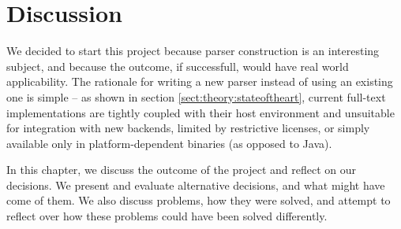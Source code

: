 \chapter{Discussion}
\label{chapter:discussion}
We decided to start this project because parser construction is an interesting
subject, and because the outcome, if successfull, would have real world
applicability. The rationale for writing a new parser instead of using an
existing one is simple -- as shown in section \ref{sect:theory:stateoftheart},
current full-text implementations are tightly coupled with their
host environment and unsuitable for integration with new backends, limited by
restrictive licenses, or simply available only in platform-dependent binaries
(as opposed to Java). 

In this chapter, we discuss the outcome of the project and reflect on
our decisions. We present and evaluate alternative decisions, and what
might have come of them. We also discuss problems, how they were
solved, and attempt to reflect over how these problems could have been solved
differently.






















